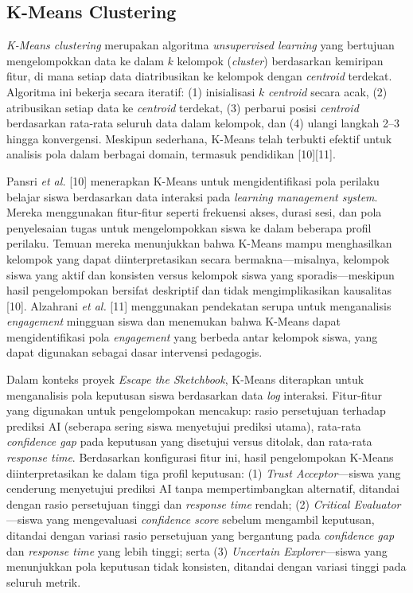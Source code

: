 \documentclass[12pt,oneside]{report}
\begin{document}
\subsection{K-Means Clustering}
\label{subsec:kmeans}

\textit{K-Means clustering} merupakan algoritma \textit{unsupervised learning} yang bertujuan mengelompokkan data ke dalam $k$ kelompok (\textit{cluster}) berdasarkan kemiripan fitur, di mana setiap data diatribusikan ke kelompok dengan \textit{centroid} terdekat. Algoritma ini bekerja secara iteratif: (1) inisialisasi $k$ \textit{centroid} secara acak, (2) atribusikan setiap data ke \textit{centroid} terdekat, (3) perbarui posisi \textit{centroid} berdasarkan rata-rata seluruh data dalam kelompok, dan (4) ulangi langkah 2--3 hingga konvergensi. Meskipun sederhana, K-Means telah terbukti efektif untuk analisis pola dalam berbagai domain, termasuk pendidikan [10][11].

Pansri \textit{et al.} [10] menerapkan K-Means untuk mengidentifikasi pola perilaku belajar siswa berdasarkan data interaksi pada \textit{learning management system}. Mereka menggunakan fitur-fitur seperti frekuensi akses, durasi sesi, dan pola penyelesaian tugas untuk mengelompokkan siswa ke dalam beberapa profil perilaku. Temuan mereka menunjukkan bahwa K-Means mampu menghasilkan kelompok yang dapat diinterpretasikan secara bermakna—misalnya, kelompok siswa yang aktif dan konsisten versus kelompok siswa yang sporadis—meskipun hasil pengelompokan bersifat deskriptif dan tidak mengimplikasikan kausalitas [10]. Alzahrani \textit{et al.} [11] menggunakan pendekatan serupa untuk menganalisis \textit{engagement} mingguan siswa dan menemukan bahwa K-Means dapat mengidentifikasi pola \textit{engagement} yang berbeda antar kelompok siswa, yang dapat digunakan sebagai dasar intervensi pedagogis.

Dalam konteks proyek \textit{Escape the Sketchbook}, K-Means diterapkan untuk menganalisis pola keputusan siswa berdasarkan data \textit{log} interaksi. Fitur-fitur yang digunakan untuk pengelompokan mencakup: rasio persetujuan terhadap prediksi AI (seberapa sering siswa menyetujui prediksi utama), rata-rata \textit{confidence gap} pada keputusan yang disetujui versus ditolak, dan rata-rata \textit{response time}. Berdasarkan konfigurasi fitur ini, hasil pengelompokan K-Means diinterpretasikan ke dalam tiga profil keputusan: (1) \textit{Trust Acceptor}—siswa yang cenderung menyetujui prediksi AI tanpa mempertimbangkan alternatif, ditandai dengan rasio persetujuan tinggi dan \textit{response time} rendah; (2) \textit{Critical Evaluator}—siswa yang mengevaluasi \textit{confidence score} sebelum mengambil keputusan, ditandai dengan variasi rasio persetujuan yang bergantung pada \textit{confidence gap} dan \textit{response time} yang lebih tinggi; serta (3) \textit{Uncertain Explorer}—siswa yang menunjukkan pola keputusan tidak konsisten, ditandai dengan variasi tinggi pada seluruh metrik.
\end{document}
